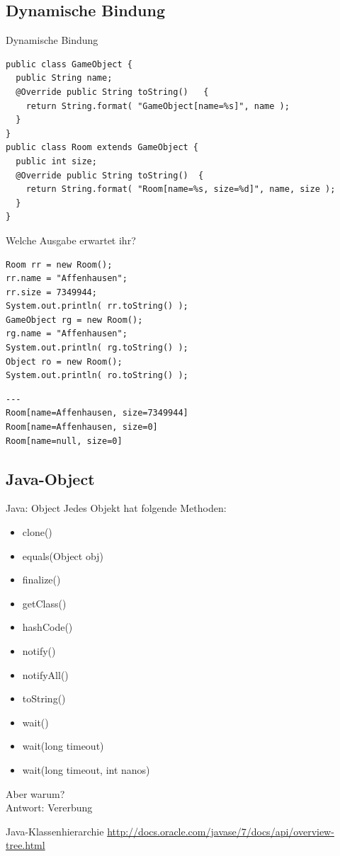 \documentclass[18pt]{beamer}
\begin{document}
\subsection{Dynamische Bindung}
\begin{frame}[fragile]{Dynamische Bindung}

 \begin{lstlisting}
public class GameObject {
  public String name;
  @Override public String toString()   {
    return String.format( "GameObject[name=%s]", name );
  }
}
public class Room extends GameObject {
  public int size;
  @Override public String toString()  {
    return String.format( "Room[name=%s, size=%d]", name, size );
  }
} \end{lstlisting}

\end{frame}

\begin{frame}[fragile]{Welche Ausgabe erwartet ihr?}
 \begin{lstlisting}
Room rr = new Room();
rr.name = "Affenhausen";
rr.size = 7349944;
System.out.println( rr.toString() );
GameObject rg = new Room();
rg.name = "Affenhausen";
System.out.println( rg.toString() );
Object ro = new Room();
System.out.println( ro.toString() );
 \end{lstlisting}
 \pause
 \begin{lstlisting}
---
Room[name=Affenhausen, size=7349944]
Room[name=Affenhausen, size=0]
Room[name=null, size=0]
\end{lstlisting}

\end{frame}

\subsection{Java-Object}
\begin{frame}{Java: Object}
  \small
 Jedes Objekt hat folgende Methoden:
 \begin{itemize}
  \item clone()
  \item equals(Object obj)
  \item finalize()
  \item getClass()
  \item hashCode()
  \item notify()
  \item notifyAll()
  \item toString()
  \item wait()
  \item wait(long timeout)
  \item wait(long timeout, int nanos)
 \end{itemize} \pause
 Aber warum? \pause \\
 \large Antwort: Vererbung
 

\end{frame}
\begin{frame}{Java-Klassenhierarchie}
 \url{http://docs.oracle.com/javase/7/docs/api/overview-tree.html}
\end{frame}
\end{document}
